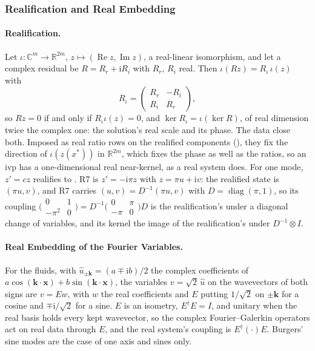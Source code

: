\subsubsection{Realification and Real Embedding}
\label{app:realification}

\paragraph{Realification.} Let $\iota:\mathbb{C}^m\to\mathbb{R}^{2m}$, $z\mapsto(\operatorname{Re}z,\operatorname{Im}z)$, a real-linear isomorphism, and let a complex residual be $R=R_r+\mathrm{i}R_i$ with $R_r$, $R_i$ real. Then $\iota(Rz)=R_\iota\,\iota(z)$ with
\begin{equation}
    R_\iota=\begin{pmatrix}R_r & -R_i\\ R_i & R_r\end{pmatrix},
\end{equation}
so $Rz=0$ if and only if $R_\iota\iota(z)=0$, and $\ker R_\iota=\iota(\ker R)$, of real dimension twice the complex one: the solution's real scale and its phase. The data close both. Imposed as real ratio rows on the realified components (), they fix the direction of $\iota(z(x^*))$ in $\mathbb{R}^{2m}$, which fixes the phase as well as the ratios, so an \gls{ivp} has a one-dimensional real near-kernel, as a real system does. For one mode, $z'=cz$ realifies to . R7 is $z'=-\mathrm{i}\pi z$ with $z=\pi u+\mathrm{i}v$: the realified state is $(\pi u,v)$, and R7 carries $(u,v)=D^{-1}(\pi u,v)$ with $D=\operatorname{diag}(\pi,1)$, so its coupling $\bigl(\begin{smallmatrix}0&1\\-\pi^2&0\end{smallmatrix}\bigr)=D^{-1}\bigl(\begin{smallmatrix}0&\pi\\-\pi&0\end{smallmatrix}\bigr)D$ is the realification's under a diagonal change of variables, and its kernel the image of the realification's under $D^{-1}\otimes I$.

\paragraph{Real Embedding of the Fourier Variables.} For the fluids, with $\hat u_{\pm\mathbf k}=(a\mp\mathrm{i}b)/2$ the complex coefficients of $a\cos(\mathbf k\cdot\mathbf x)+b\sin(\mathbf k\cdot\mathbf x)$, the variables $v=\sqrt2\,\hat u$ on the wavevectors of both signs are $v=Ew$, with $w$ the real coefficients and $E$ putting $1/\sqrt2$ on $\pm\mathbf k$ for a cosine and $\mp\mathrm{i}/\sqrt2$ for a sine. $E$ is an isometry, $E^\dagger E=I$, and unitary when the real basis holds every kept wavevector, so the complex Fourier--Galerkin operators act on real data through $E$, and the real system's coupling is $E^\dagger(\cdot)E$. Burgers' sine modes are the case of one axis and sines only.

